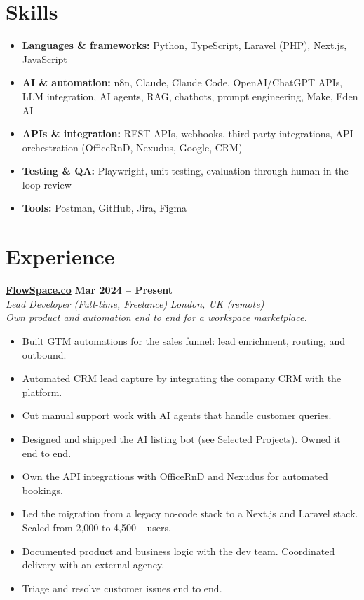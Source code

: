 \documentclass[a4paper,7pt]{article}
\newcommand{\role}[4]{%
 \textbf{#1} \hfill \textbf{#2}\\[0pt]%
 \textit{#3} \hfill \textit{#4}\\[0pt]%
}
\begin{document}
\section{Skills}
\begin{itemize}
 \item \textbf{Languages \& frameworks:} Python, TypeScript, Laravel (PHP), Next.js, JavaScript
 \item \textbf{AI \& automation:} n8n, Claude, Claude Code, OpenAI/ChatGPT APIs, LLM integration, AI agents, RAG, chatbots, prompt engineering, Make, Eden AI
 \item \textbf{APIs \& integration:} REST APIs, webhooks, third-party integrations, API orchestration (OfficeRnD, Nexudus, Google, CRM)
 \item \textbf{Testing \& QA:} Playwright, unit testing, evaluation through human-in-the-loop review
 \item \textbf{Tools:} Postman, GitHub, Jira, Figma
\end{itemize}

\section{Experience}

\role{\href{https://flowspace.co}{FlowSpace.co}}{Mar 2024 -- Present}{Lead Developer (Full-time, Freelance)}{London, UK (remote)}
\textit{Own product and automation end to end for a workspace marketplace.}
\begin{itemize}
 \item Built GTM automations for the sales funnel: lead enrichment, routing, and outbound.
 \item Automated CRM lead capture by integrating the company CRM with the platform.
 \item Cut manual support work with AI agents that handle customer queries.
 \item Designed and shipped the AI listing bot (see Selected Projects). Owned it end to end.
 \item Own the API integrations with OfficeRnD and Nexudus for automated bookings.
 \item Led the migration from a legacy no-code stack to a Next.js and Laravel stack. Scaled from 2,000 to 4,500+ users.
 \item Documented product and business logic with the dev team. Coordinated delivery with an external agency.
 \item Triage and resolve customer issues end to end.
\end{itemize}
\end{document}
